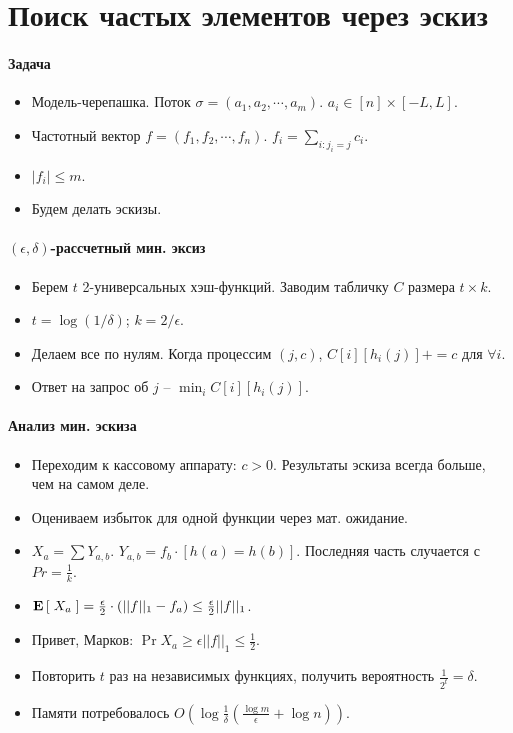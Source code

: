 \section{Поиск частых элементов через эскиз} %
\label{sec:freq_elements_via_sketching}

\paragraph{Задача} %
\label{par:problem}
\begin{itemize}
	\item Модель-черепашка. Поток $\sigma = (a_1, a_2, \cdots, a_m)$. $a_i \in [n] \times [-L, L]$. 
	\item Частотный вектор $f = (f_1, f_2, \cdots, f_n)$. $f_i = \sum_{i: j_i = j} c_i$.
	\item $|f_i| \leq m$.
	\item Будем делать эскизы.
\end{itemize}

\paragraph{$(\epsilon, \delta)$-рассчетный мин. эксиз} %
\label{par:cm-sketch}
\begin{itemize}
	\item Берем $t$ 2-универсальных хэш-функций. Заводим табличку $C$ размера $t \times k$.
	\item $t = \log(1 \slash \delta)$; $k = 2 \slash \epsilon$.
	\item Делаем все по нулям. Когда процессим $(j, c)$, $C[i][h_i(j)] += c$ для $\forall i$.
	\item Ответ на запрос об $j$ -- $\min_i C[i][h_i(j)]$.
\end{itemize}

\paragraph{Анализ мин. эскиза} %
\label{par:analysis_cms}
\begin{itemize}
	\item Переходим к кассовому аппарату: $c > 0$. Результаты эскиза всегда больше, чем на самом деле.
	\item Оцениваем избыток для одной функции через мат. ожидание.
	\item $X_a = \sum Y_{a,b}$. $Y_{a, b} = f_b \cdot [h(a) = h(b)]$. Последняя часть случается с $Pr = \frac{1}{k}$.
	\item $\textbf{E}\left[\;  X_a  \;\right] = \frac{\epsilon}{2} \cdot (||f||_1 - f_a) \leq \frac{\epsilon}{2} ||f||_1$.
	\item Привет, Марков: $\Pr{X_a \geq \epsilon ||f||_1} \leq \frac{1}{2}$.
	\item Повторить $t$ раз на независимых функциях, получить вероятность $\frac{1}{2^t} = \delta$.
	\item Памяти потребовалось $O(\log \frac{1}{\delta} (\frac{\log m}{\epsilon} + \log n))$.
\end{itemize}

